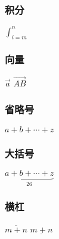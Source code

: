 \documentclass{article}
\begin{document}
\subsubsection{积分}
$\int_{i=m}^{n}$
\subsubsection{向量}
$\vec a$
$\overrightarrow{AB}$
\subsubsection{省略号}
$a+b+\cdots+z$
\subsubsection{大括号}
$\underbrace{a+b+\cdots+z}_{26}$
\subsubsection{横杠}
$\overline{m+n}$
$\underline{m+n}$
\end{document}
